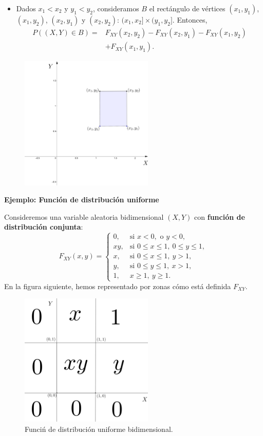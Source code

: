 \documentclass[]{book}
\providecommand{\tightlist}{%
  \setlength{\itemsep}{0pt}\setlength{\parskip}{0pt}}
\begin{document}
\begin{itemize}
\tightlist
\item
  Dados \(x_1<x_2\) y \(y_1<y_2\), consideramos \(B\) el rectángulo de vértices \((x_1,y_1)\), \((x_1,y_2)\), \((x_2,y_1)\) y \((x_2,y_2)\): \((x_1,x_2]\times (y_1,y_2]\). Entonces,
  \[
  \begin{array}{rl}
  P((X,Y)\in B)  = & F_{XY}(x_2,y_2)-F_{XY}(x_2,y_1)-F_{XY}(x_1,y_2)\\ & +F_{XY}(x_1,y_1).
  \end{array}
  \]
\end{itemize}

\begin{figure}
\includegraphics[width=2.5in]{Images/Fxy3} \end{figure}

\textbf{Ejemplo: Función de distribución uniforme}

Consideremos una variable aleatoria bidimensional \((X,Y)\) con \textbf{función de distribución conjunta}:
\[
F_{XY}(x,y)=\begin{cases}
0, & \mbox{si }x<0,\mbox{ o }y<0,\\
xy, & \mbox{si }0\leq x\leq 1,\ 0\leq y\leq 1, \\
x, & \mbox{si }0\leq x\leq 1,\ y> 1, \\
y, & \mbox{si }0\leq y\leq 1,\ x> 1, \\
1, & x\geq 1,\ y\geq 1.
\end{cases}
\]
En la figura siguiente, hemos representado por zonas cómo está definida \(F_{XY}\).

\begin{figure}
\includegraphics[width=2.5in]{Images/FxyEx} \caption{Funciń de distribución uniforme bidimensional.}\label{fig:bid7}
\end{figure}
\end{document}
